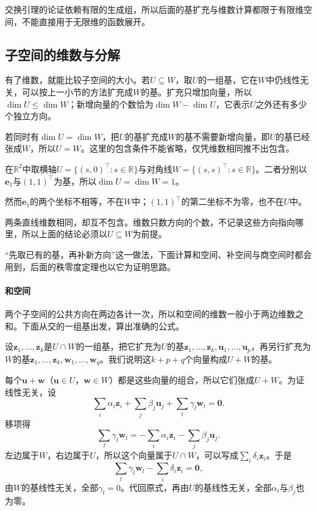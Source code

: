 交换引理的论证依赖有限的生成组，所以后面的基扩充与维数计算都限于有限维空间，不能直接用于无限维的函数展开。

\subsection{子空间的维数与分解}
有了维数，就能比较子空间的大小。若$U\subseteq W$，取$U$的一组基，它在$W$中仍线性无关，可以按上一小节的方法扩充成$W$的基。扩充只增加向量，所以$\dim U\leq\dim W$；新增向量的个数恰为$\dim W-\dim U$，它表示$U$之外还有多少个独立方向。

若同时有$\dim U=\dim W$，把$U$的基扩充成$W$的基不需要新增向量，即$U$的基已经张成$W$，所以$U=W$。这里的包含条件不能省略，仅凭维数相同推不出包含。
\begin{example}[反例：同维而互不包含的两条直线]
\label{ex:ls-equal-dimension-not-nested}
在$\mathbb R^2$中取横轴$U=\{(s,0)^\top:s\in\mathbb R\}$与对角线$W=\{(s,s)^\top:s\in\mathbb R\}$。二者分别以$\bm e_1$与$(1,1)^\top$为基，所以$\dim U=\dim W=1$。

然而$\bm e_1$的两个坐标不相等，不在$W$中；$(1,1)^\top$的第二坐标不为零，也不在$U$中。

两条直线维数相同，却互不包含。维数只数方向的个数，不记录这些方向指向哪里，所以上面的结论必须以$U\subseteq W$为前提。
\end{example}
“先取已有的基，再补新方向”这一做法，下面计算和空间、补空间与商空间时都会用到，后面的秩零度定理也以它为证明思路。

\paragraph{和空间}
两个子空间的公共方向在两边各计一次，所以和空间的维数一般小于两边维数之和。下面从交的一组基出发，算出准确的公式。

设$\bm z_1,\ldots,\bm z_k$是$U\cap W$的一组基，把它扩充为$U$的基$\bm z_1,\ldots,\bm z_k,\bm u_1,\ldots,\bm u_p$，再另行扩充为$W$的基$\bm z_1,\ldots,\bm z_k,\bm w_1,\ldots,\bm w_q$。我们说明这$k+p+q$个向量构成$U+W$的基。

每个$\bm u+\bm w$（$\bm u\in U$，$\bm w\in W$）都是这些向量的组合，所以它们张成$U+W$。为证线性无关，设
\[
 \sum_i\alpha_i\bm z_i+\sum_j\beta_j\bm u_j+\sum_l\gamma_l\bm w_l=\bm0 .
\]
移项得
\[
 \sum_l\gamma_l\bm w_l=-\sum_i\alpha_i\bm z_i-\sum_j\beta_j\bm u_j .
\]
左边属于$W$，右边属于$U$，所以这个向量属于$U\cap W$，可以写成$\sum_i\delta_i\bm z_i$。于是
\[
 \sum_l\gamma_l\bm w_l-\sum_i\delta_i\bm z_i=\bm0,
\]
由$W$的基线性无关，全部$\gamma_l=0$。代回原式，再由$U$的基线性无关，全部$\alpha_i$与$\beta_j$也为零。


